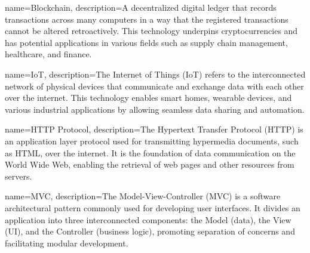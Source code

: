 


{
    name=Blockchain,
    description={A decentralized digital ledger that records transactions across many computers in a way that the registered transactions cannot be altered retroactively. This technology underpins cryptocurrencies and has potential applications in various fields such as supply chain management, healthcare, and finance.}
}

{
    name=IoT,
    description={The Internet of Things (IoT) refers to the interconnected network of physical devices that communicate and exchange data with each other over the internet. This technology enables smart homes, wearable devices, and various industrial applications by allowing seamless data sharing and automation.}
}

{
    name=HTTP Protocol,
    description={The Hypertext Transfer Protocol (HTTP) is an application layer protocol used for transmitting hypermedia documents, such as HTML, over the internet. It is the foundation of data communication on the World Wide Web, enabling the retrieval of web pages and other resources from servers.}
}

{
    name=MVC,
    description={The Model-View-Controller (MVC) is a software architectural pattern commonly used for developing user interfaces. It divides an application into three interconnected components: the Model (data), the View (UI), and the Controller (business logic), promoting separation of concerns and facilitating modular development.}
}
